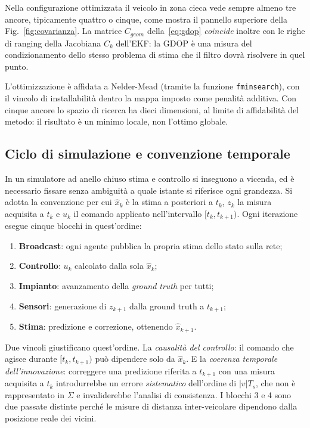 \documentclass[conference,9pt]{IEEEtran}
\begin{document}
Nella configurazione ottimizzata il veicolo in zona cieca vede sempre almeno
tre ancore, tipicamente quattro o cinque, come mostra il pannello superiore
della Fig.~\ref{fig:covarianza}. La matrice $C_{geom}$ della~\eqref{eq:gdop} \emph{coincide} inoltre con le righe di ranging della Jacobiana
$C_k$ dell'EKF: la GDOP \`e una misura del condizionamento dello stesso problema di stima che il
filtro dovr\`a risolvere in quel punto.

L'ottimizzazione \`e affidata a Nelder-Mead (tramite la funzione \texttt{fminsearch}), con il vincolo di installabilit\`a
dentro la mappa imposto come penalit\`a additiva. Con cinque ancore lo spazio di
ricerca ha dieci dimensioni, al limite di affidabilit\`a del metodo: il
risultato \`e un minimo locale, non l'ottimo globale.

\subsection{Ciclo di simulazione e convenzione temporale}

In un simulatore ad anello chiuso stima e controllo si inseguono a vicenda, ed
\`e necessario fissare senza ambiguit\`a a quale istante si riferisce ogni
grandezza. Si adotta la convenzione per cui $\hat x_k$ \`e la stima a
posteriori a $t_k$, $z_k$ la misura acquisita a $t_k$ e $u_k$ il comando
applicato nell'intervallo $[t_k, t_{k+1})$. Ogni iterazione esegue cinque
blocchi in quest'ordine:

\begin{enumerate}
\item \textbf{Broadcast}: ogni agente pubblica la propria stima dello stato
      sulla rete;
\item \textbf{Controllo}: $u_k$ calcolato dalla sola $\hat x_k$;
\item \textbf{Impianto}: avanzamento della \emph{ground truth} per tutti;
\item \textbf{Sensori}: generazione di $z_{k+1}$ dalla ground truth a $t_{k+1}$;
\item \textbf{Stima}: predizione e correzione, ottenendo $\hat x_{k+1}$.
\end{enumerate}

Due vincoli giustificano quest'ordine. La \emph{causalit\`a del controllo}: il
comando che agisce durante $[t_k, t_{k+1})$ pu\`o dipendere solo da $\hat x_k$. E
la \emph{coerenza temporale dell'innovazione}: correggere una predizione
riferita a $t_{k+1}$ con una misura acquisita a $t_k$ introdurrebbe un errore
\emph{sistematico} dell'ordine di $|v|T_s$, che non \`e rappresentato in
$\Sigma$ e invaliderebbe l'analisi di consistenza. I blocchi 3 e 4 sono due
passate distinte perch\'e le misure di distanza inter-veicolare dipendono dalla
posizione reale dei vicini.
\end{document}
